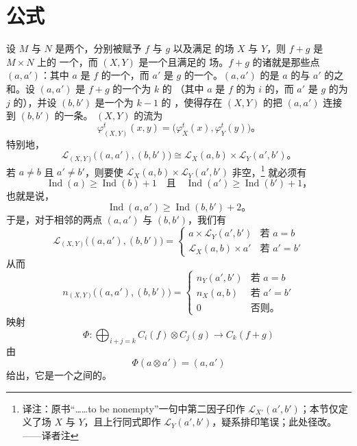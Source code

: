
\section{\trKunneth{}公式}
\label{sec:kuenneth-formula}

设 $M$ 与 $N$ 是两个\trManifold，分别被赋予\trMorseFunction{} $f$ 与 $g$ 以及满足%
\trSmaleCondition{}的\trPseudogradient{}场 $X$ 与 $Y$，则 $f+g$ 是 $M\times N$ 上的
一个\trMorseFunction，而 $(X,Y)$ 是一个\trAdapted{}且满足\trSmaleCondition{}的%
\trPseudogradient{}场。$f+g$ 的诸\trCriticalPoint{}就是那些点 $(a,a')$：其中 $a$ 是 $f$
的一个\trCriticalPoint，而 $a'$ 是 $g$ 的一个\trCriticalPoint。$(a,a')$ 的\trIndex{}是
$a$ 的\trIndex{}与 $a'$ 的\trIndex{}之和。设 $(a,a')$ 是 $f+g$ 的一个\trIndex{}为 $k$ 的%
\trCriticalPoint（其中 $a$ 是 $f$ 的\trIndex{}为 $i$ 的\trCriticalPoint，而 $a'$ 是 $g$
的\trIndex{}为 $j$ 的\trCriticalPoint），并设 $(b,b')$ 是一个\trIndex{}为 $k-1$ 的%
\trCriticalPoint，使得存在 $(X,Y)$ 的把 $(a,a')$ 连接到 $(b,b')$ 的一条\trTrajectory。
$(X,Y)$ 的流为
\[
\varphi^t_{(X,Y)}(x,y)=\bigl(\varphi^t_X(x),\varphi^t_Y(y)\bigr)\text{。}
\]
特别地，
\[
\mathcal{L}_{(X,Y)}\bigl((a,a'),(b,b')\bigr)
  \cong\mathcal{L}_X(a,b)\times\mathcal{L}_Y(a',b')\text{。}
\]
若 $a\neq b$ 且 $a'\neq b'$，则要使 $\mathcal{L}_X(a,b)\times\mathcal{L}_Y(a',b')$ 非空，\footnote{译注：原书“……to be nonempty”一句中第二因子印作 $\mathcal{L}_{X'}(a',b')$；本节仅定义了场 $X$ 与 $Y$，且上行同式即作 $\mathcal{L}_Y(a',b')$，疑系排印笔误；此处径改。——译者注}
就必须有
\[
\operatorname{Ind}(a)\ge\operatorname{Ind}(b)+1
\quad\text{且}\quad
\operatorname{Ind}(a')\ge\operatorname{Ind}(b')+1\text{，}
\]
也就是说，
\[
\operatorname{Ind}(a,a')\ge\operatorname{Ind}(b,b')+2\text{。}
\]
于是，对于\trIndex{}相邻的两点 $(a,a')$ 与 $(b,b')$，我们有
\[
\mathcal{L}_{(X,Y)}\bigl((a,a'),(b,b')\bigr)=
\begin{cases}
a\times\mathcal{L}_Y(a',b') & \text{若 } a=b\\
\mathcal{L}_X(a,b)\times a' & \text{若 } a'=b'
\end{cases}
\]
从而
\[
n_{(X,Y)}\bigl((a,a'),(b,b')\bigr)=
\begin{cases}
n_Y(a',b') & \text{若 } a=b\\
n_X(a,b) & \text{若 } a'=b'\\
0 & \text{否则。}
\end{cases}
\]
映射
\[
\varPhi\colon\bigoplus_{i+j=k}C_i(f)\otimes C_j(g)\longrightarrow C_k(f+g)
\]
由
\[
\varPhi(a\otimes a')=(a,a')
\]
给出，它是一个\trAbelianGroup{}之间的\trIsomorphism。

